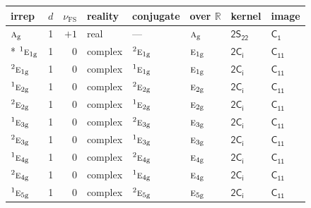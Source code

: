 \documentclass[10pt,a4paper]{article}
\numberwithin{equation}{section}
\newcommand{\grp}[1]{\mathsf{#1}}
\newcommand{\irr}[1]{\text{\normalfont\scshape #1}}
\newcommand{\conjpair}[1]{{}^{#1}}
\newcommand{\ptag}[1]{\mathrm{#1}}
\newcommand{\fsind}{\nu_{\mathrm{FS}}}
\begin{document}
{\small\renewcommand{\arraystretch}{1.25}\setlength{\tabcolsep}{4pt}\begin{longtable}{@{}lrrlllll@{}}\toprule
irrep & $d$ & $\fsind$ & reality & conjugate & over $\mathbb{R}$ & kernel & image\\\midrule\endhead
\bottomrule\endfoot\endlastfoot
$\irr{a}_{\ptag{g}}$ & 1 & $+1$ & real & --- & $\irr{a}_{\ptag{g}}$ & \href{2S22.pdf}{$\grp{2S_{22}}$} & \href{../../../rotation/data/pdf/C1.pdf}{$\grp{C_{1}}$}\\*
$\conjpair{1}\irr{e}_{1\ptag{g}}$ & 1 & $0$ & complex & $\conjpair{2}\irr{e}_{1\ptag{g}}$ & $\irr{e}_{1\ptag{g}}$ & \href{2S2.pdf}{$\grp{2C_{i}}$} & \href{../../../rotation/data/pdf/C11.pdf}{$\grp{C_{11}}$}\\
$\conjpair{2}\irr{e}_{1\ptag{g}}$ & 1 & $0$ & complex & $\conjpair{1}\irr{e}_{1\ptag{g}}$ & $\irr{e}_{1\ptag{g}}$ & \href{2S2.pdf}{$\grp{2C_{i}}$} & \href{../../../rotation/data/pdf/C11.pdf}{$\grp{C_{11}}$}\\
$\conjpair{1}\irr{e}_{2\ptag{g}}$ & 1 & $0$ & complex & $\conjpair{2}\irr{e}_{2\ptag{g}}$ & $\irr{e}_{2\ptag{g}}$ & \href{2S2.pdf}{$\grp{2C_{i}}$} & \href{../../../rotation/data/pdf/C11.pdf}{$\grp{C_{11}}$}\\
$\conjpair{2}\irr{e}_{2\ptag{g}}$ & 1 & $0$ & complex & $\conjpair{1}\irr{e}_{2\ptag{g}}$ & $\irr{e}_{2\ptag{g}}$ & \href{2S2.pdf}{$\grp{2C_{i}}$} & \href{../../../rotation/data/pdf/C11.pdf}{$\grp{C_{11}}$}\\
$\conjpair{1}\irr{e}_{3\ptag{g}}$ & 1 & $0$ & complex & $\conjpair{2}\irr{e}_{3\ptag{g}}$ & $\irr{e}_{3\ptag{g}}$ & \href{2S2.pdf}{$\grp{2C_{i}}$} & \href{../../../rotation/data/pdf/C11.pdf}{$\grp{C_{11}}$}\\
$\conjpair{2}\irr{e}_{3\ptag{g}}$ & 1 & $0$ & complex & $\conjpair{1}\irr{e}_{3\ptag{g}}$ & $\irr{e}_{3\ptag{g}}$ & \href{2S2.pdf}{$\grp{2C_{i}}$} & \href{../../../rotation/data/pdf/C11.pdf}{$\grp{C_{11}}$}\\
$\conjpair{1}\irr{e}_{4\ptag{g}}$ & 1 & $0$ & complex & $\conjpair{2}\irr{e}_{4\ptag{g}}$ & $\irr{e}_{4\ptag{g}}$ & \href{2S2.pdf}{$\grp{2C_{i}}$} & \href{../../../rotation/data/pdf/C11.pdf}{$\grp{C_{11}}$}\\
$\conjpair{2}\irr{e}_{4\ptag{g}}$ & 1 & $0$ & complex & $\conjpair{1}\irr{e}_{4\ptag{g}}$ & $\irr{e}_{4\ptag{g}}$ & \href{2S2.pdf}{$\grp{2C_{i}}$} & \href{../../../rotation/data/pdf/C11.pdf}{$\grp{C_{11}}$}\\
$\conjpair{1}\irr{e}_{5\ptag{g}}$ & 1 & $0$ & complex & $\conjpair{2}\irr{e}_{5\ptag{g}}$ & $\irr{e}_{5\ptag{g}}$ & \href{2S2.pdf}{$\grp{2C_{i}}$} & \href{../../../rotation/data/pdf/C11.pdf}{$\grp{C_{11}}$}\\

\end{longtable}}
\end{document}

